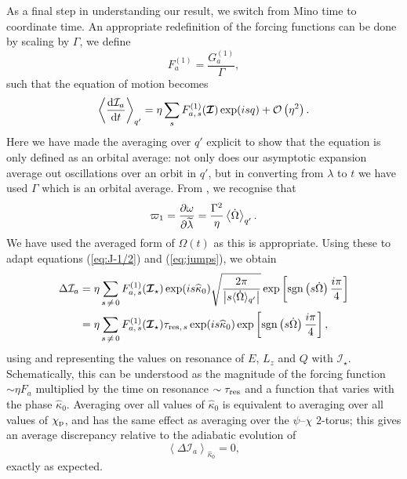 As a final step in understanding our result, we switch from Mino time to coordinate time. An appropriate redefinition of the forcing functions can be done by scaling by $\Gamma$, we define
\begin{equation}
F_a^{(1)} = \dfrac{G_a^{(1)}}{\Gamma},
\end{equation}
such that the equation of motion becomes
\begin{equation}
\left\langle \dfrac{\mathrm{d} {\mathcal{I}_a}}{\mathrm{d} {t}}\right\rangle_{q'} =  \eta\sum_s F_{a,\,s}^{(1)}(\boldsymbol{\mathcal{I}})\exp(is q) + \mathcal{O}\left({\eta^2}\right).
\end{equation}
Here we have made the averaging over $q'$ explicit to show that the equation is only defined as an orbital average: not only does our asymptotic expansion average out oscillations over an orbit in $q'$, but in converting from $\lambda$ to $t$ we have used $\Gamma$ which is an orbital average.
From , we recognise that
\begin{equation}
\varpi_1 = \dfrac{\partial {\omega}}{\partial {\widetilde{\lambda}}} = \dfrac{\Gamma^2}{\eta}\left\langle\dot{\Omega}\right\rangle_{q'}.
\end{equation}
We have used the averaged form of $\Omega(t)$ as this is appropriate. Using these to adapt equations (\ref{eq:J-1/2}) and (\ref{eq:jumps}), we obtain
\begin{align}
\Delta \mathcal{I}_a = {} & \eta\sum_{s\,\neq\,0}F_{a,\,s}^{(1)}(\boldsymbol{\mathcal{I}}_\star)\exp(is \widehat{\kappa}_0)\sqrt{\dfrac{2\pi}{\left|s \langle\dot{\Omega}\rangle_{q'}\right|}}\exp\left[\operatorname{sgn}\left(s\dot{\Omega}\right)\dfrac{i\pi}{4}\right] \\
 = {} & \eta\sum_{s\,\neq\,0}F_{a,\,s}^{(1)}(\boldsymbol{\mathcal{I}}_\star)\tau_{\mathrm{res},\,s}\exp(is \widehat{\kappa}_0)\exp\left[\operatorname{sgn}\left(s\dot{\Omega}\right)\dfrac{i\pi}{4}\right],
\end{align}
using  and representing the values on resonance of $E$, $L_z$ and $Q$ with $\boldsymbol{\mathcal{I}}_\star$. Schematically, this can be understood as the magnitude of the forcing function $\sim \eta F_a$ multiplied by the time on resonance $\sim \tau_\mathrm{res}$ and a function that varies with the phase $\widehat{\kappa}_0$. Averaging over all values of $\widehat{\kappa}_0$ is equivalent to averaging over all values of $\chi_\mathrm{p}$, and has the same effect as averaging over the $\psi$--$\chi$ $2$-torus; this gives an average discrepancy relative to the adiabatic evolution of
\begin{equation}
\left\langle \Delta \mathcal{I}_a \right\rangle_{\hat{\kappa}_0} = 0,
\end{equation}
exactly as expected.

